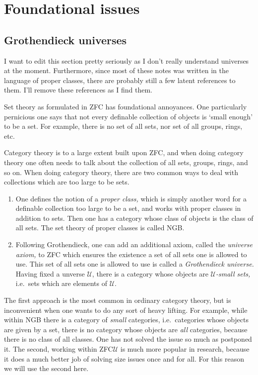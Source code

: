 \documentclass[main.tex]{subfiles}
\begin{document}
\chapter{Foundational issues}
\label{ch:_foundational_issues}

\section{Grothendieck universes}
\label{sec:grothendieck_universes}

\begin{note}
  I want to edit this section pretty seriously as I don't really understand universes at the moment. Furthermore, since most of these notes was written in the language of proper classes, there are probably still a few latent references to them. I'll remove these references as I find them.
\end{note}

Set theory as formulated in ZFC has foundational annoyances. One particularly pernicious one says that not every definable collection of objects is `small enough' to be a set. For example, there is no set of all sets, nor set of all groups, rings, etc.

Category theory is to a large extent built upon ZFC, and when doing category theory one often needs to talk about the collection of all sets, groups, rings, and so on. When doing category theory, there are two common ways to deal with collections which are too large to be sets.
\begin{enumerate}
  \item One defines the notion of a \emph{proper class,} which is simply another word for a definable collection too large to be a set, and works with proper classes in addition to sets. Then one has a category whose class of objects is the class of all sets. The set theory of proper classes is called NGB.

  \item Following Grothendieck, one can add an additional axiom, called the \emph{universe axiom,} to ZFC which ensures the existence a set of all sets one is allowed to use. This set of all sets one is allowed to use is called a \emph{Grothendieck universe.} Having fixed a unverse $\mathcal{U}$, there is a category whose objects are \emph{$\mathcal{U}$-small sets,} i.e.\ sets which are elements of $\mathcal{U}$.
\end{enumerate}

The first approach is the most common in ordinary category theory, but is inconvenient when one wants to do any sort of heavy lifting. For example, while within NGB there is a category of \emph{small} categories, i.e.\ categories whose objects are given by a set, there is no category whose objects are \emph{all} categories, because there is no class of all classes. One has not solved the issue so much as postponed it. The second, working within ZFC$\mathcal{U}$ is much more popular in research, because it does a much better job of solving size issues once and for all. For this reason we will use the second here.
\end{document}
